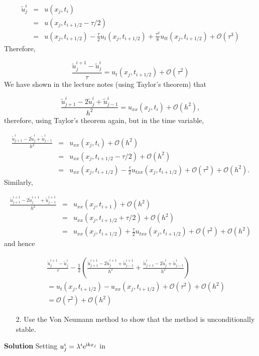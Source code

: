 \documentclass[12pt,a4paper]{article}
\begin{document}
\begin{eqnarray*}
\tilde{u}^{i}_j  &=& u(x_{j},t_{i})\\
                 &=& u(x_j,t_{i+1/2}-\tau/2) \\
                 &=& u(x_j,t_{i+1/2}) - \frac{\tau}{2}u_t(x_j,t_{i+1/2}) + \frac{\tau^2}{8}u_{tt}(x_j,t_{i+1/2}) + \mathcal{O}(\tau^3)
\end{eqnarray*}
Therefore,

\[
\frac{\tilde{u}^{i+1}_j - \tilde{u}^i_j}{\tau} = u_t(x_j,t_{i+1/2}) + \mathcal{O}(\tau^2)
\]
We have shown in the lecture notes (using Taylor's theorem) that

\[
\frac{\tilde{u}^{i}_{j+1} - 2\tilde{u}^{i}_{j} + \tilde{u}^{i}_{j-1}}{h^2} = u_{xx}(x_j,t_i) + \mathcal{O}(h^2),
\]
therefore, using Taylor's theorem again, but in the time variable,


\begin{eqnarray*}
\frac{\tilde{u}^{i}_{j+1} - 2\tilde{u}^{i}_{j} + \tilde{u}^{i}_{j-1}}{h^2} &=& u_{xx}(x_j,t_i) + \mathcal{O}(h^2)  \\
&=&  u_{xx}(x_j,t_{i+1/2}-\tau/2) + \mathcal{O}(h^2) \\
&=&  u_{xx}(x_j,t_{i+1/2}) - \frac{\tau}{2}u_{txx}(x_j,t_{i+1/2}) +  \mathcal{O}(\tau^2) + \mathcal{O}(h^2).
\end{eqnarray*}
Similarly,


\begin{eqnarray*}
\frac{\tilde{u}^{i+1}_{j+1} - 2\tilde{u}^{i+1}_{j} + \tilde{u}^{i+1}_{j-1}}{h^2} &=& u_{xx}(x_j,t_{i+1}) + \mathcal{O}(h^2)  \\
&=&  u_{xx}(x_j,t_{i+1/2}+\tau/2) + \mathcal{O}(h^2) \\
&=&  u_{xx}(x_j,t_{i+1/2}) + \frac{\tau}{2}u_{txx}(x_j,t_{i+1/2}) +  \mathcal{O}(\tau^2) + \mathcal{O}(h^2)
\end{eqnarray*}
and hence


\begin{eqnarray*}
&& \frac{\tilde{u}^{i+1}_j - \tilde{u}^i_j}{\tau} - \frac{1}{2}\left( \frac{\tilde{u}^{i+1}_{j+1} - 2\tilde{u}^{i+1}_{j} + \tilde{u}^{i+1}_{j-1}}{h^2} + \frac{\tilde{u}^{i}_{j+1} - 2\tilde{u}^{i}_{j} + \tilde{u}^{i}_{j-1}}{h^2}   \right) \\
&& =  u_t(x_j,t_{i+1/2}) - u_{xx}(x_j,t_{i+1/2})  +  \mathcal{O}(\tau^2) + \mathcal{O}(h^2) \\
&& = \mathcal{O}(\tau^2) + \mathcal{O}(h^2)
\end{eqnarray*}
\begin{itemize}
\item[2. ] Use the Von Neumann method to show that the method is unconditionally stable.

\end{itemize}
\textbf{Solution} Setting $u^{i}_j = \lambda^i {\rm e}^{{\rm i}kx_j}$ in
\end{document}

